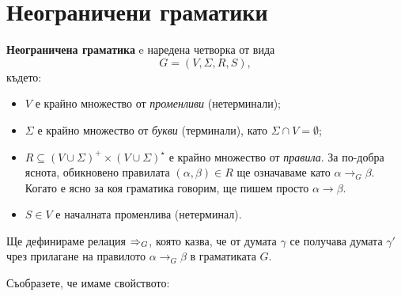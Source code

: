 \section{Неограничени граматики}\label{sect:unrestricted-grammar}

{\bf Неограничена граматика} e наредена четворка от вида
\[G = (V, \Sigma, R, S),\]
където:
\begin{itemize}
\item
  $V$ е крайно множество от {\em променливи} (нетерминали);
\item
  $\Sigma$ е крайно множество от {\em букви} (терминали), като $\Sigma \cap V = \emptyset$;
\item
  $R \subseteq (V\cup\Sigma)^+ \times (V \cup \Sigma)^\star$ е крайно множество от {\em правила}.
  За по-добра яснота, обикновено правилата $(\alpha, \beta) \in R$ ще означаваме като 
  $\alpha \to_G \beta$. Когато е ясно за коя граматика говорим, ще пишем просто $\alpha \to \beta$.
\item
  $S \in V$ е началната променлива (нетерминал). 
\end{itemize}

Ще дефинираме релация $\derive{}_G$, която казва, че от думата $\gamma$ се получава думата $\gamma'$ чрез прилагане на правилото $\alpha \to_G \beta$ в граматиката $G$.

\begin{important}
  \begin{prooftree}
  \end{prooftree}
\end{important}



Съобразете, че имаме свойството:
  \begin{prooftree}
  \end{prooftree}


